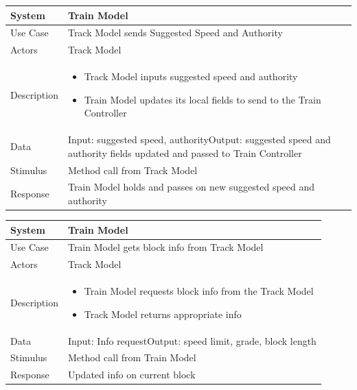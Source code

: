 \documentclass{article}
\begin{document}
    \begin{longtable}{
    || >{\raggedright\arraybackslash}m{}
    | >{\raggedright\arraybackslash}m{}||}
    \hline
    \textbf{System} &  \textbf{Train Model} \\
    \hline
    Use Case & Track Model sends Suggested Speed and Authority\\
    \hline
    Actors & Track Model\\
    \hline
    Description & \begin{itemize}
        \item Track Model inputs suggested speed and authority
        \item Train Model updates its local fields to send to the Train Controller
    \end{itemize}\\
    \hline
    Data & Input: suggested speed, authority\newline Output: suggested speed and authority fields updated and passed to Train Controller\\
    \hline
    Stimulus & Method call from Track Model\\
    \hline
    Response & Train Model holds and passes on new suggested speed and authority\\
    \hline
    \end{longtable}
    
    \begin{longtable}{
    || >{\raggedright\arraybackslash}m{}
    | >{\raggedright\arraybackslash}m{}||}
    \hline
    \textbf{System} &  \textbf{Train Model} \\
    \hline
    Use Case & Train Model gets block info from Track Model\\
    \hline
    Actors & Track Model\\
    \hline
    Description & \begin{itemize}
        \item Train Model requests block info from the Track Model
        \item Track Model returns appropriate info
    \end{itemize}\\
    \hline
    Data & Input: Info request\newline Output: speed limit, grade, block length\\
    \hline
    Stimulus & Method call from Train Model\\
    \hline
    Response & Updated info on current block\\
    \hline
    \end{longtable}
    
\end{document}
